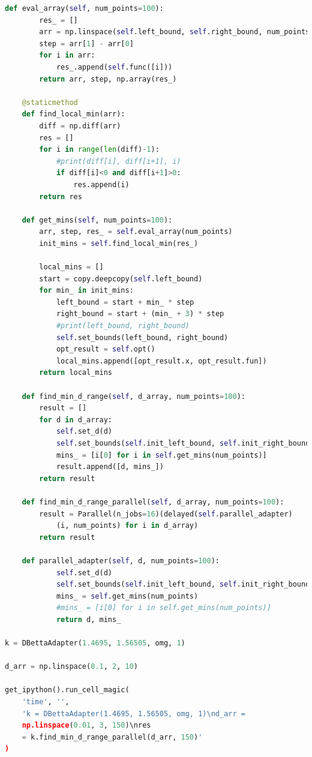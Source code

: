 \documentclass{article}
\begin{document}
\begin{lstlisting}[language=Python]
    def eval_array(self, num_points=100):
        res_ = []
        arr = np.linspace(self.left_bound, self.right_bound, num_points)
        step = arr[1] - arr[0]
        for i in arr:
            res_.append(self.func([i]))
        return arr, step, np.array(res_)
    
    @staticmethod
    def find_local_min(arr):
        diff = np.diff(arr)
        res = []
        for i in range(len(diff)-1):
            #print(diff[i], diff[i+1], i)
            if diff[i]<0 and diff[i+1]>0:
                res.append(i)
        return res
    
    def get_mins(self, num_points=100):
        arr, step, res_ = self.eval_array(num_points)
        init_mins = self.find_local_min(res_)
        
        local_mins = []
        start = copy.deepcopy(self.left_bound)
        for min_ in init_mins:
            left_bound = start + min_ * step
            right_bound = start + (min_ + 3) * step
            #print(left_bound, right_bound)
            self.set_bounds(left_bound, right_bound)
            opt_result = self.opt()
            local_mins.append([opt_result.x, opt_result.fun])
        return local_mins
    
    def find_min_d_range(self, d_array, num_points=100):
        result = []
        for d in d_array:
            self.set_d(d)
            self.set_bounds(self.init_left_bound, self.init_right_bound)
            mins_ = [i[0] for i in self.get_mins(num_points)]
            result.append([d, mins_])
        return result
    
    def find_min_d_range_parallel(self, d_array, num_points=100):
        result = Parallel(n_jobs=16)(delayed(self.parallel_adapter)
            (i, num_points) for i in d_array)
        return result
    
    def parallel_adapter(self, d, num_points=100):
            self.set_d(d)
            self.set_bounds(self.init_left_bound, self.init_right_bound)
            mins_ = self.get_mins(num_points)
            #mins_ = [i[0] for i in self.get_mins(num_points)]
            return d, mins_

k = DBettaAdapter(1.4695, 1.56505, omg, 1)

d_arr = np.linspace(0.1, 2, 10)

get_ipython().run_cell_magic(
    'time', '',
    'k = DBettaAdapter(1.4695, 1.56505, omg, 1)\nd_arr = 
    np.linspace(0.01, 3, 150)\nres 
    = k.find_min_d_range_parallel(d_arr, 150)'
)


\end{lstlisting}
\end{document}

